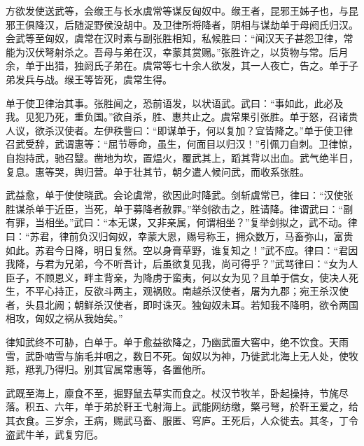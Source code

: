 \documentclass[12pt,UTF8]{ctexbook}
\begin{document}
方欲发使送武等，会缑王与长水虞常等谋反匈奴中。缑王者，昆邪王姊子也，与昆邪王俱降汉，后随浞野侯没胡中。及卫律所将降者，阴相与谋劫单于母阏氏归汉。会武等至匈奴，虞常在汉时素与副张胜相知，私候胜曰：“闻汉天子甚怨卫律，常能为汉伏弩射杀之。吾母与弟在汉，幸蒙其赏赐。”张胜许之，以货物与常。后月余，单于出猎，独阏氏子弟在。虞常等七十余人欲发，其一人夜亡，告之。单于子弟发兵与战。缑王等皆死，虞常生得。



单于使卫律治其事。张胜闻之，恐前语发，以状语武。武曰：“事如此，此必及我。见犯乃死，重负国。”欲自杀，胜、惠共止之。虞常果引张胜。单于怒，召诸贵人议，欲杀汉使者。左伊秩訾曰：“即谋单于，何以复加？宜皆降之。”单于使卫律召武受辞，武谓惠等：“屈节辱命，虽生，何面目以归汉！”引佩刀自刺。卫律惊，自抱持武，驰召毉。凿地为坎，置煴火，覆武其上，蹈其背以出血。武气绝半日，复息。惠等哭，舆归营。单于壮其节，朝夕遣人候问武，而收系张胜。



武益愈，单于使使晓武。会论虞常，欲因此时降武。剑斩虞常已，律曰：“汉使张胜谋杀单于近臣，当死，单于募降者赦罪。”举剑欲击之，胜请降。律谓武曰：“副有罪，当相坐。”武曰：“本无谋，又非亲属，何谓相坐？”复举剑拟之，武不动。律曰：“苏君，律前负汉归匈奴，幸蒙大恩，赐号称王，拥众数万，马畜弥山，富贵如此。苏君今日降，明日复然。空以身膏草野，谁复知之！”武不应。律曰：“君因我降，与君为兄弟，今不听吾计，后虽欲复见我，尚可得乎？”武骂律曰：“女为人臣子，不顾恩义，畔主背亲，为降虏于蛮夷，何以女为见？且单于信女，使决人死生，不平心持正，反欲斗两主，观祸败。南越杀汉使者，屠为九郡；宛王杀汉使者，头县北阙；朝鲜杀汉使者，即时诛灭。独匈奴未耳。若知我不降明，欲令两国相攻，匈奴之祸从我始矣。”



律知武终不可胁，白单于。单于愈益欲降之，乃幽武置大窖中，绝不饮食。天雨雪，武卧啮雪与旃毛并咽之，数日不死。匈奴以为神，乃徙武北海上无人处，使牧羝，羝乳乃得归。别其官属常惠等，各置他所。



武既至海上，廪食不至，掘野鼠去草实而食之。杖汉节牧羊，卧起操持，节旄尽落。积五、六年，单于弟於靬王弋射海上。武能网纺缴，檠弓弩，於靬王爱之，给其衣食。三岁余，王病，赐武马畜、服匿、穹庐。王死后，人众徙去。其冬，丁令盗武牛羊，武复穷厄。
\end{document}
